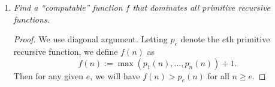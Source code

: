 \documentclass{article}
\begin{document}
\begin{enumerate}[label={\bf Q\arabic*:}]
    \begin{proof}
      We work backwards with the solution of the previous question to
      get the first three steps of the derivation. In our solution, we
      first derived addition function. Thus the first three steps are:
      \begin{enumerate}[label={\arabic*.}]
        \item $f_1(x) = x+1$
        \item $f_2(x) = x$
        \item $f_3(x_1,x_2,x_3) = x_2$
      \end{enumerate}
      The code of the third primitive recursive is therefore
      $p_1^{3+1}p_2^{2+1}=2^4\cdot3^3=1296$.
    \end{proof}

  \item \it Find a ``computable'' function $f$ that dominates all primitive
    recursive functions.

    \begin{proof}
      We use diagonal argument. Letting $p_e$ denote the $e$th primitive
      recursive function, we define $f(n)$ as
      \begin{equation*}
        f(n) := \max(p_1(n),\ldots,p_n(n))+1.
      \end{equation*}
      Then for any given $e$, we will have $f(n)>p_e(n)$ for all $n\geq e$.
    \end{proof}
\end{enumerate}
\end{document}
